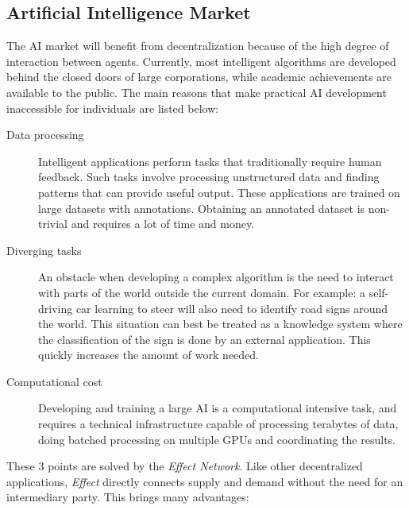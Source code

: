 \documentclass{article}
\begin{document}
\subsection{Artificial Intelligence Market}
The AI market will benefit from decentralization because of the high
degree of interaction between agents. Currently, most intelligent
algorithms are developed behind the closed doors of large
corporations, while academic achievements are available to the
public. The main reasons that make practical AI development
inaccessible for individuals are listed below:

\begin{description}
\item[Data processing] Intelligent applications perform tasks that
  traditionally require human feedback. Such tasks involve processing
  unstructured data and finding patterns that can provide useful
  output. These applications are trained on large datasets with
  annotations. Obtaining an annotated dataset is non-trivial and
  requires a lot of time and money.
  
\item[Diverging tasks] An obstacle when developing a complex
  algorithm is the need to interact with parts of the world outside
  the current domain. For example: a self-driving car learning to steer 
  will also need to identify road signs around the world. This
  situation can best be treated as a knowledge system where the
  classification of the sign is done by an external application. This
  quickly increases the amount of work needed.
  
\item[Computational cost] Developing and training a large AI is a
  computational intensive task, and requires a technical
  infrastructure capable of processing terabytes of data, doing
  batched processing on multiple GPUs and coordinating the
  results.
\end{description}

These 3 points are solved by the \emph{Effect Network}. Like other
decentralized applications, \emph{Effect} directly connects supply and
demand without the need for an intermediary party. This brings many
advantages:
\end{document}
